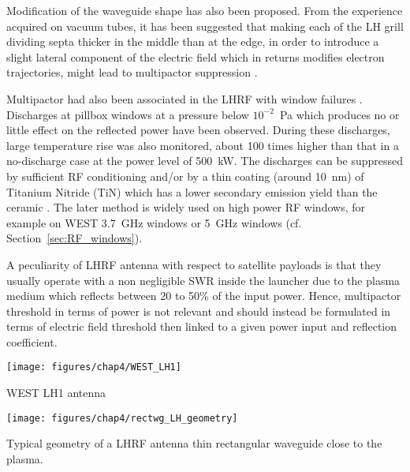 Modification of the waveguide shape has also been proposed. From the experience acquired on vacuum tubes, it has been suggested that making each of the LH grill dividing septa thicker in the middle than at the edge, in order to introduce a slight lateral component of the electric field which in returns modifies electron trajectories, might lead to multipactor suppression .

Multipactor had also been associated in the LHRF with window failures . Discharges at pillbox windows at a pressure below $10^{-2}$~Pa which produces no or little effect on the reflected power have been observed. During these discharges, large temperature rise was also monitored, about 100 times higher than that in a no-discharge case at the power level of 500~kW. The discharges can be suppressed by sufficient RF conditioning and/or by a thin coating (around 10~nm) of Titanium Nitride (TiN) which has a lower secondary emission yield than the ceramic . The later method is widely used on high power RF windows, for example on WEST 3.7~GHz windows  or 5~GHz windows  (cf. Section~\ref{sec:RF_windows}).


A peculiarity of LHRF antenna with respect to satellite payloads is that they usually operate with a non negligible SWR inside the launcher due to the plasma medium which reflects between 20 to 50\% of the input power. Hence, multipactor threshold in terms of power is not relevant and should instead be formulated in terms of electric field threshold then linked to a given power input and reflection coefficient. 

\begin{marginfigure}
	\centering
	\texttt{[image: figures/chap4/WEST\_LH1]}
	\caption{WEST LH1 antenna}
	\label{fig:westlh1}
\end{marginfigure}

\begin{marginfigure}
	\centering
	\texttt{[image: figures/chap4/rectwg\_LH\_geometry]}
	\caption{Typical geometry of a LHRF antenna thin rectangular waveguide close to the plasma.}
	\label{fig:rectwglhgeometry}
\end{marginfigure}

